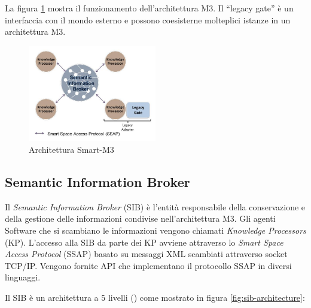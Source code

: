 La figura \ref{fig:smart-m3} mostra il funzionamento dell'architettura M3. Il ``legacy gate'' è un interfaccia con il mondo esterno e possono coesisterne molteplici istanze in un architettura M3.

\begin{figure}[H]
	\centering
	\includegraphics[width=0.5\textwidth]{assets/smart-m3.jpg}
	\caption{Architettura Smart-M3}
	\label{fig:smart-m3}
\end{figure}

\subsection{Semantic Information Broker}\label{subsec:sib}

Il \emph{Semantic Information Broker} (SIB) è l'entità responsabile della conservazione e della gestione delle informazioni condivise nell'architettura M3. Gli agenti Software che si scambiano le informazioni vengono chiamati \emph{Knowledge Processors} (KP). L'accesso alla SIB da parte dei KP avviene attraverso lo \emph{Smart Space Access Protocol}  (SSAP) basato su messaggi XML scambiati attraverso socket TCP/IP. Vengono fornite API che implementano il protocollo SSAP in diversi linguaggi.

Il SIB è un architettura a 5 livelli (\cite{smart2010}) come mostrato in figura \ref{fig:sib-architecture}:

